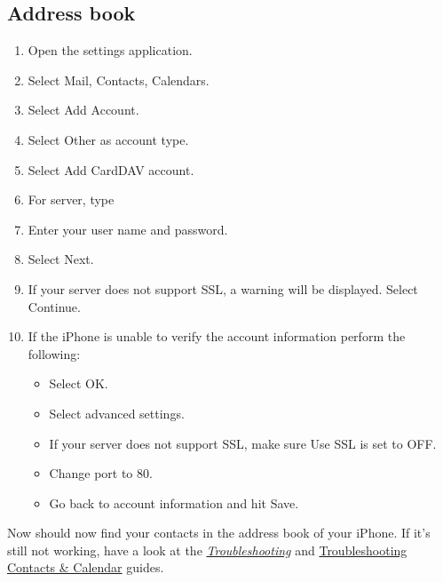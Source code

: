 \documentclass[letterpaper,10pt,english]{sphinxmanual}
\begin{document}
\subsection{Address book}
\label{pim/sync_ios:address-book}\begin{enumerate}
\item {} 
Open the settings application.

\item {} 
Select Mail, Contacts, Calendars.

\item {} 
Select Add Account.

\item {} 
Select Other as account type.

\item {} 
Select Add CardDAV account.

\item {} 
For server, type 

\item {} 
Enter your user name and password.

\item {} 
Select Next.

\item {} 
If your server does not support SSL, a warning will be displayed.
Select Continue.

\item {} 
If the iPhone is unable to verify the account information perform the
following:
\begin{itemize}
\item {} 
Select OK.

\item {} 
Select advanced settings.

\item {} 
If your server does not support SSL, make sure Use SSL is set to OFF.

\item {} 
Change port to 80.

\item {} 
Go back to account information and hit Save.

\end{itemize}

\end{enumerate}

Now should now find your contacts in the address book of your iPhone.
If it's still not working, have a look at the {\hyperref[pim/troubleshooting::doc]{\emph{Troubleshooting}}}
and \href{https://doc.owncloud.org/server/9.0/admin\_manual/issues/index.html\#troubleshooting-contacts-calendar}{Troubleshooting Contacts \& Calendar} guides.
\end{document}

